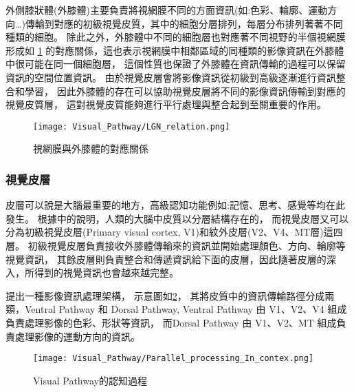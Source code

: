 \documentclass[class=NCU_thesis, crop=false]{standalone}
\begin{document}
外側膝狀體(外膝體)主要負責將視網膜不同的方面資訊(如:色彩、輪廓、運動方向…)傳輸到對應的初級視覺皮質，其中的細胞分層排列，每層分布排列著著不同種類的細胞。
除此之外，外膝體中不同的細胞層也對應著不同視野的半個視網膜形成如 \cref{fig:LGN_Relation}
的對應關係，這也表示視網膜中相鄰區域的同種類的影像資訊在外膝體中很可能在同一個細胞層，
這個性質也保證了外膝體在資訊傳輸的過程可以保留資訊的空間位置資訊。
由於視覺皮層會將影像資訊從初級到高級逐漸進行資訊整合和學習，
因此外膝體的存在可以協助視覺皮層將不同的影像資訊傳輸到對應的視覺皮質層，
這對視覺皮質能夠進行平行處理與整合起到至關重要的作用。

\begin{figure}[H]
  \centering
  \texttt{[image: Visual\_Pathway/LGN\_relation.png]}
  \caption{視網膜與外膝體的對應關係~\cite{bear2016neuroscience}}
  \label{fig:LGN_Relation}
\end{figure}
\pagebreak

\subsubsection{視覺皮層}
皮層可以說是大腦最重要的地方，高級認知功能例如:記憶、思考、感覺等均在此發生。
根據\cite{1180370208}中的說明，人類的大腦中皮質以分層結構存在的，
而視覺皮層又可以分為初級視覺皮層(Primary visual cortex, V1)和紋外皮層(V2、V4、MT層)這四層。
初級視覺皮層負責接收外膝體傳輸來的資訊並開始處理顏色、方向、輪廓等視覺資訊，
其餘皮層則負責整合和傳遞資訊給下面的皮層，因此隨著皮層的深入，所得到的視覺資訊也會越來越完整。

\cite{1180370208}提出一種影像資訊處理架構，
示意圖如\cref{fig:ParallelProcess}，
其將皮質中的資訊傳輸路徑分成兩類，Ventral Pathway 和 Dorsal Pathway, 
Ventral Pathway 由 V1、V2、V4 組成負責處理影像的色彩、形狀等資訊，
而Dorsal Pathway 由 V1、V2、MT 組成負責處理影像的運動方向的資訊。

\begin{figure}[H]
  \centering
  \texttt{[image: Visual\_Pathway/Parallel\_processing\_In\_contex.png]}
  \caption{Visual Pathway的認知過程~\cite{1180370208}}
  \label{fig:ParallelProcess}
\end{figure}

\end{document}
